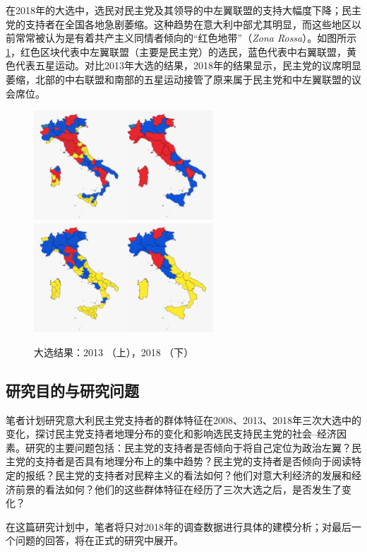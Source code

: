 \documentclass[12pt,a4paper]{ctexart}
\begin{document}
    在2018年的大选中，选民对民主党及其领导的中左翼联盟的支持大幅度下降；民主党的支持者在全国各地急剧萎缩。这种趋势在意大利中部尤其明显，而这些地区以前常常被认为是有着共产主义同情者倾向的``红色地带''（\textit{Zona Rossa}）。如图所示\ref{gen1318}，红色区块代表中左翼联盟（主要是民主党）的选民，蓝色代表中右翼联盟，黄色代表五星运动。对比2013年大选的结果，2018年的结果显示，民主党的议席明显萎缩，北部的中右联盟和南部的五星运动接管了原来属于民主党和中左翼联盟的议会席位。


    \begin{figure}
        \centering
        \includegraphics[width=0.6\textwidth]{images//2013gen.png}
        \includegraphics[width=0.6\textwidth]{images//2018gen.png}
        \caption{大选结果：2013 （上），2018 （下）}
        \label{gen1318}
    \end{figure}
    
    \subsection{研究目的与研究问题}
    笔者计划研究意大利民主党支持者的群体特征在2008、2013、2018年三次大选中的变化，探讨民主党支持者地理分布的变化和影响选民支持民主党的社会--经济因素。研究的主要问题包括：民主党的支持者是否倾向于将自己定位为政治左翼？民主党的支持者是否具有地理分布上的集中趋势？民主党的支持者是否倾向于阅读特定的报纸？民主党的支持者对民粹主义的看法如何？他们对意大利经济的发展和经济前景的看法如何？他们的这些群体特征在经历了三次大选之后，是否发生了变化？

    在这篇研究计划中，笔者将只对2018年的调查数据进行具体的建模分析；对最后一个问题的回答，将在正式的研究中展开。
\end{document}
